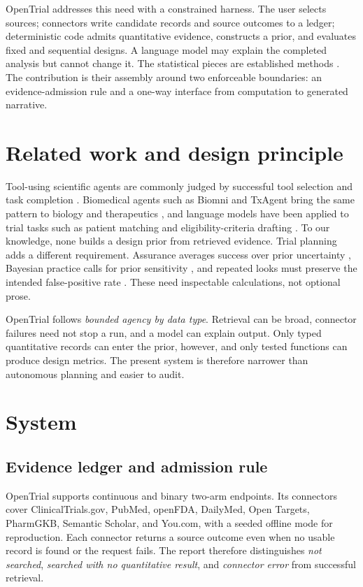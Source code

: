 \documentclass{article}
\begin{document}
OpenTrial addresses this need with a constrained harness. The user selects sources; connectors write candidate records and source outcomes to a ledger; deterministic code admits quantitative evidence, constructs a prior, and evaluates fixed and sequential designs. A language model may explain the completed analysis but cannot change it. The statistical pieces are established methods \citep{dersimonian1986,ohagan2005,obrien1979,pocock1977}. The contribution is their assembly around two enforceable boundaries: an evidence-admission rule and a one-way interface from computation to generated narrative.

\section{Related work and design principle}

Tool-using scientific agents are commonly judged by successful tool selection and task completion \citep{boiko2023,bran2024,ding2025}. Biomedical agents such as Biomni and TxAgent bring the same pattern to biology and therapeutics \citep{huang2026,gao2025}, and language models have been applied to trial tasks such as patient matching and eligibility-criteria drafting \citep{jin2024,wang2023}. To our knowledge, none builds a design prior from retrieved evidence. Trial planning adds a different requirement. Assurance averages success over prior uncertainty \citep{ohagan2005}, Bayesian practice calls for prior sensitivity \citep{spiegelhalter2004}, and repeated looks must preserve the intended false-positive rate \citep{fda2019}. These need inspectable calculations, not optional prose.

OpenTrial follows \emph{bounded agency by data type}. Retrieval can be broad, connector failures need not stop a run, and a model can explain output. Only typed quantitative records can enter the prior, however, and only tested functions can produce design metrics. The present system is therefore narrower than autonomous planning and easier to audit.

\section{System}

\subsection{Evidence ledger and admission rule}

OpenTrial supports continuous and binary two-arm endpoints. Its connectors cover ClinicalTrials.gov, PubMed, openFDA, DailyMed, Open Targets, PharmGKB, Semantic Scholar, and You.com, with a seeded offline mode for reproduction. Each connector returns a source outcome even when no usable record is found or the request fails. The report therefore distinguishes \emph{not searched}, \emph{searched with no quantitative result}, and \emph{connector error} from successful retrieval.
\end{document}
